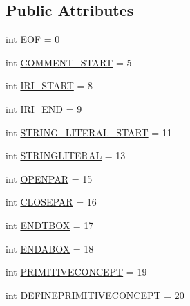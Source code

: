 \subsection*{Public Attributes}
\begin{DoxyCompactItemize}
\item 
int \hyperlink{interfaceorg_1_1coode_1_1owl_1_1krssparser_1_1_k_r_s_s_parser_constants_ae3234acd22bc2475c331fc8e5a1ae363}{E\-O\-F} = 0
\item 
int \hyperlink{interfaceorg_1_1coode_1_1owl_1_1krssparser_1_1_k_r_s_s_parser_constants_a296b3bf6df717d4c787b768617c168b6}{C\-O\-M\-M\-E\-N\-T\-\_\-\-S\-T\-A\-R\-T} = 5
\item 
int \hyperlink{interfaceorg_1_1coode_1_1owl_1_1krssparser_1_1_k_r_s_s_parser_constants_a560394909fb10fbb14890b715b1328be}{I\-R\-I\-\_\-\-S\-T\-A\-R\-T} = 8
\item 
int \hyperlink{interfaceorg_1_1coode_1_1owl_1_1krssparser_1_1_k_r_s_s_parser_constants_a288dc1ccb2ea23fde148a6260525703d}{I\-R\-I\-\_\-\-E\-N\-D} = 9
\item 
int \hyperlink{interfaceorg_1_1coode_1_1owl_1_1krssparser_1_1_k_r_s_s_parser_constants_abbcf45ab3428b7ffae3d0286e309e04f}{S\-T\-R\-I\-N\-G\-\_\-\-L\-I\-T\-E\-R\-A\-L\-\_\-\-S\-T\-A\-R\-T} = 11
\item 
int \hyperlink{interfaceorg_1_1coode_1_1owl_1_1krssparser_1_1_k_r_s_s_parser_constants_ab2623cd0796632cbf5076eff4c00c30d}{S\-T\-R\-I\-N\-G\-L\-I\-T\-E\-R\-A\-L} = 13
\item 
int \hyperlink{interfaceorg_1_1coode_1_1owl_1_1krssparser_1_1_k_r_s_s_parser_constants_aba1b6829e32a5697f5e8b877dcb64af8}{O\-P\-E\-N\-P\-A\-R} = 15
\item 
int \hyperlink{interfaceorg_1_1coode_1_1owl_1_1krssparser_1_1_k_r_s_s_parser_constants_a1d5241d9ff4dcbc2d3c625934107aefc}{C\-L\-O\-S\-E\-P\-A\-R} = 16
\item 
int \hyperlink{interfaceorg_1_1coode_1_1owl_1_1krssparser_1_1_k_r_s_s_parser_constants_a5f73a3512a1c1c9de44fd415b53012ac}{E\-N\-D\-T\-B\-O\-X} = 17
\item 
int \hyperlink{interfaceorg_1_1coode_1_1owl_1_1krssparser_1_1_k_r_s_s_parser_constants_a7beb5ade3f79699b0c02e19aa7b2fb03}{E\-N\-D\-A\-B\-O\-X} = 18
\item 
int \hyperlink{interfaceorg_1_1coode_1_1owl_1_1krssparser_1_1_k_r_s_s_parser_constants_a734a3e5b21c5ff1c083232a8621986f1}{P\-R\-I\-M\-I\-T\-I\-V\-E\-C\-O\-N\-C\-E\-P\-T} = 19
\item 
int \hyperlink{interfaceorg_1_1coode_1_1owl_1_1krssparser_1_1_k_r_s_s_parser_constants_a3379698d5f65be17f31d893247b87d6f}{D\-E\-F\-I\-N\-E\-P\-R\-I\-M\-I\-T\-I\-V\-E\-C\-O\-N\-C\-E\-P\-T} = 20

\end{DoxyCompactItemize}
